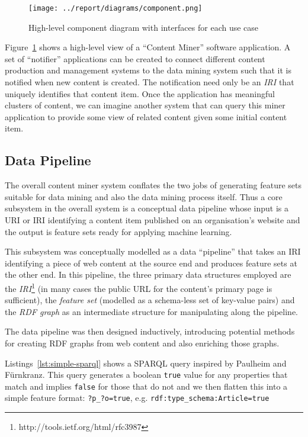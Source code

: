 \documentclass{sig-alternate-05-2015}
\begin{document}
\begin{figure}[h]
  \begin{center}
    \texttt{[image: ../report/diagrams/component.png]}
  \end{center}
  \caption{High-level component diagram with interfaces for each use case\label{fig:component}}
\end{figure}

Figure~\ref{fig:component} shows a high-level view of a ``Content Miner''
software application. A set of ``notifier''
applications can be created to connect different content production and
management systems to the data mining system such that it is notified when new
content is created. The notification need only be an \emph{IRI} that uniquely
identifies that content item. Once the application has meaningful clusters of
content, we can imagine another system that can query this miner application
to provide some view of related content given some initial content item.

\subsection{Data Pipeline}

The overall content miner system conflates the two jobs of generating
feature sets suitable for data mining and also the data mining process itself.
Thus a core subsystem in the overall system is a conceptual data pipeline whose
input is a URI or IRI identifying a content item published on an organisation's
website and the output is feature sets ready for applying machine learning.

This subsystem was conceptually modelled as a data ``pipeline'' that takes
an IRI identifying a piece of web content at the source end and produces
feature sets at the other end. In this pipeline, the three primary data
structures employed are the \emph{IRI}\footnote{http://tools.ietf.org/html/rfc3987}
(in many cases the public URL for the content's primary page is sufficient),
the \emph{feature set} (modelled as a schema-less set of key-value pairs)
and the \emph{RDF graph} as an intermediate structure for manipulating along
the pipeline.

The data pipeline was then designed inductively, introducing potential
methods for creating RDF graphs from web content and also enriching those
graphs.

Listings~\ref{lst:simple-sparql} shows a SPARQL query inspired by Paulheim and F\"urnkranz\cite{paulheim2012unsupervised}.
This
query generates a boolean \texttt{true} value for any properties that match
and implies \texttt{false} for those that do not and we then flatten this into
a simple feature format: \texttt{?p\_?o=true},
e.g. \texttt{rdf:type\_schema:Article=true}
\end{document}
